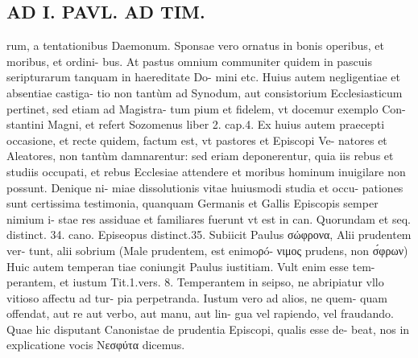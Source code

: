 \documentclass{article}
\begin{document}
\begin{pages}
\section*{AD I. PAVL. AD TIM. }
\marginpar{[ p.Ro ]}\pstart rum, a tentationibus Daemonum. Sponsae vero ornatus in bonis operibus, et moribus, et ordini- bus. At pastus omnium communiter quidem in pascuis seripturarum tanquam in haereditate Do- mini etc.  \pend\pstart Huius autem negligentiae et absentiae castiga- tio non tantùm ad Synodum, aut consistorium Ecclesiasticum pertinet, sed etiam ad Magistra- tum pium et fidelem, vt docemur exemplo Con- stantini Magni, et refert Sozomenus liber  2. cap.4.  \pend\pstart Ex huius autem praecepti occasione, et recte quidem, factum est, vt pastores et Episcopi Ve- natores et Aleatores, non tantùm damnarentur: sed eriam deponerentur, quia iis rebus et studiis occupati, et rebus Ecclesiae attendere et moribus hominum inuigilare non possunt. Denique ni- miae dissolutionis vitae huiusmodi studia et occu- pationes sunt certissima testimonia, quanquam Germanis et Gallis Episcopis semper nimium i- stae res assiduae et familiares fuerunt vt est in can. Quorundam et seq. distinct. 34. cano. Episeopus distinct.35.  \pend\pstart Subiicit Paulus σώφρονα, Alii prudentem ver- tunt, alii sobrium (Male prudentem, est enimoρó- νιμος prudens, non σ́φρων) Huic autem temperan tiae coniungit Paulus iustitiam. Vult enim esse tem- perantem, et iustum Tit.1.vers. 8. Temperantem in seipso, ne abripiatur vllo vitioso affectu ad tur- pia perpetranda. Iustum vero ad alios, ne quem- quam offendat, aut re aut verbo, aut manu, aut lin- gua vel rapiendo, vel fraudando. Quae hic disputant Canonistae de prudentia Episcopi, qualis esse de- beat, nos in explicatione vocis Nεσφύτα dicemus.  \pend

\end{pages}
\end{document}
